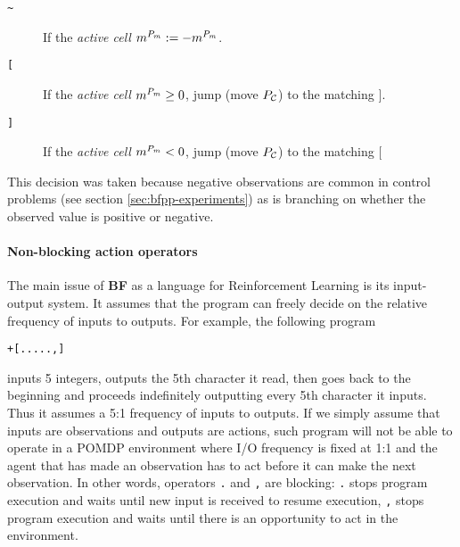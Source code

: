 \begin{description}
\item[ \texttt{\~} ] If the \textit{active cell} $m^{P_m} := - m^{P_m}$.
\item[ \texttt{[} ] If the \textit{active cell} $m^{P_m} \geq 0$, jump (move $P_{\mathcal{C}}$) to the matching $]$.
\item[ \texttt{]} ] If the \textit{active cell} $m^{P_m} < 0$, jump (move $P_{\mathcal{C}}$) to the matching $[$
\end{description}

This decision was taken because negative observations are common in control problems (see section \ref{sec:bfpp-experiments}) as is branching on whether the observed value is positive or negative. 

\paragraph{Non-blocking action operators}
\label{sec:queue}


The main issue of \textbf{BF} as a language for Reinforcement Learning is its input-output system.
It assumes that the program can freely decide on the relative frequency of inputs to outputs.
For example, the following program

\begin{center}
\begin{lstlisting}
+[.....,]
\end{lstlisting}
\end{center}

inputs 5 integers, outputs the 5th character it read, then goes back to the beginning and proceeds indefinitely outputting every 5th character it inputs.
Thus it assumes a 5:1 frequency of inputs to outputs.
If we simply assume that inputs are observations and outputs are actions, such program will not be able to operate in a POMDP environment where I/O frequency is fixed at 1:1 and the agent that has made an observation has to act before it can make the next observation.
In other words, operators \texttt{.} and \texttt{,} are blocking: \texttt{.} stops program execution and waits until new input is received to resume execution, \texttt{,} stops program execution and waits until there is an opportunity to act in the environment.


